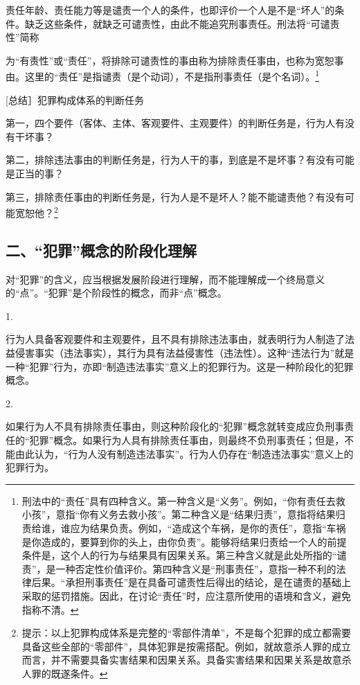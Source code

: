 责任年龄、责任能力等是谴责一个人的条件，也即评价一个人是不是“坏人”的条件。缺乏这些条件，就缺乏可谴责性，由此不能追究刑事责任。刑法将“可谴责性”简称

为“有责性”或“责任”，将排除可谴责性的事由称为排除责任事由，也称为宽恕事由。这里的“责任”是指谴责（是个动词），不是指刑事责任（是个名词）。\footnote{刑法中的“责任”具有四种含义。第一种含义是“义务”。例如，“你有责任去救小孩”，意指“你有义务去救小孩”。第二种含义是“结果归责”，意指将结果归责给谁，谁应为结果负责。例如，“造成这个车祸，是你的责任”，意指“车祸是你造成的，要算到你的头上，由你负责”。能够将结果归责给一个人的前提条件是，这个人的行为与结果具有因果关系。第三种含义就是此处所指的“谴责”，是一种否定性价值评价。第四种含义是“刑事责任”，意指一种不利的法律后果。“承担刑事责任”是在具备可谴责性后得出的结论，是在谴责的基础上采取的惩罚措施。因此，在讨论“责任”时，应注意所使用的语境和含义，避免指称不清。}

[总结］犯罪构成体系的判断任务

第一，四个要件（客体、主体、客观要件、主观要件）的判断任务是，行为人有没有干坏事？

第二，排除违法事由的判断任务是，行为人干的事，到底是不是坏事？有没有可能是正当的事？

第三，排除责任事由的判断任务是，行为人是不是坏人？能不能谴责他？有没有可能宽恕他？\footnote{提示：以上犯罪构成体系是完整的“零部件清单”，不是每个犯罪的成立都需要具备这些全部的“零部件”，具体犯罪是按需搭配。例如，就故意杀人罪的成立而言，并不需要具备实害结果和因果关系。具备实害结果和因果关系是故意杀人罪的既遂条件。}

\subsection*{二、“犯罪”概念的阶段化理解}

对“犯罪”的含义，应当根据发展阶段进行理解，而不能理解成一个终局意义的“点”。“犯罪”是个阶段性的概念，而非“点”概念。

1.

行为人具备客观要件和主观要件，且不具有排除违法事由，就表明行为人制造了法益侵害事实（违法事实），其行为具有法益侵害性（违法性）。这种“违法行为”就是一种“犯罪”行为，亦即“制造违法事实”意义上的犯罪行为。这是一种阶段化的犯罪概念。

2.

如果行为人不具有排除责任事由，则这种阶段化的“犯罪”概念就转变成应负刑事责任的“犯罪”概念。如果行为人具有排除责任事由，则最终不负刑事责任；但是，不能由此认为，“行为人没有制造违法事实”。行为人仍存在“制造违法事实”意义上的犯罪行为。

